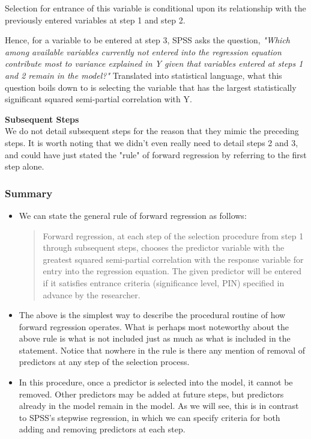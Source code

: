 \documentclass[a4paper,12pt]{article}
\begin{document}
\noindent Selection for entrance of this variable is conditional upon its relationship with the previously entered variables at step 1 and step 2. 

Hence, for a variable to be entered at step 3, SPSS asks the question, \textit{"Which among available variables currently not entered into the regression equation contribute most to variance explained in Y given that variables entered at steps 1 and 2 remain in the model?"} Translated into statistical language, what this question boils down to is selecting the variable that has the largest statistically significant squared semi-partial correlation with Y.

\noindent  \textbf{Subsequent Steps } \\
We do not detail subsequent steps for the reason that they mimic the preceding steps. It is worth noting that we didn't even really need to detail steps 2 and 3, and could have just stated the "rule" of forward regression by referring to the first step alone. 

\subsubsection*{Summary}
\begin{itemize}
	\item We can state the general rule of forward regression as follows:
	\begin{quote}
		Forward regression, at each step of the selection procedure from step 1 through subsequent steps, chooses the predictor variable with the greatest squared semi-partial correlation with the response variable for entry into the regression equation. The given predictor will be entered if it satisfies entrance criteria (significance level, PIN) specified in advance by the researcher.
	\end{quote}
	
\item	The above is the simplest way to describe the procedural routine of how forward regression operates. What is perhaps most noteworthy about the above rule is what is not included just as much as what is included in the statement. Notice that nowhere in the rule is there any mention of removal of predictors at any step of the selection process. 
	
\item	In this procedure, once a predictor is selected into the model, it cannot be removed. Other predictors may be added at future steps, but predictors already in the model remain in the model. As we will see, this is in contrast to SPSS's stepwise regression, in which we can specify criteria for both adding and removing predictors at each step.
	
\end{itemize}
\end{document}

